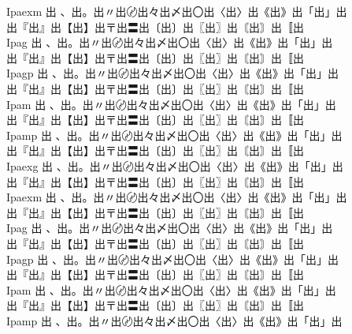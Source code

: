\begin{tabbing}
Ipaexm \> {\mktsFontfileIpaexm{}出 、出。出〃出〄出々出〆出〇出〈出〉出《出》出「出」出}\\
\> {\mktsFontfileIpaexm{}出『出』出【出】出〒出〓出〔出〕出〖出〗出〘出〙出〚出} \\
Ipag \> {\mktsFontfileIpag{}出 、出。出〃出〄出々出〆出〇出〈出〉出《出》出「出」出}\\
\> {\mktsFontfileIpag{}出『出』出【出】出〒出〓出〔出〕出〖出〗出〘出〙出〚出} \\
Ipagp \> {\mktsFontfileIpagp{}出 、出。出〃出〄出々出〆出〇出〈出〉出《出》出「出」出}\\
\> {\mktsFontfileIpagp{}出『出』出【出】出〒出〓出〔出〕出〖出〗出〘出〙出〚出} \\
Ipam \> {\mktsFontfileIpam{}出 、出。出〃出〄出々出〆出〇出〈出〉出《出》出「出」出}\\
\> {\mktsFontfileIpam{}出『出』出【出】出〒出〓出〔出〕出〖出〗出〘出〙出〚出} \\
Ipamp \> {\mktsFontfileIpamp{}出 、出。出〃出〄出々出〆出〇出〈出〉出《出》出「出」出}\\
\> {\mktsFontfileIpamp{}出『出』出【出】出〒出〓出〔出〕出〖出〗出〘出〙出〚出} \\
Ipaexg \> {\mktsFontfileIpaexg{}出 、出。出〃出〄出々出〆出〇出〈出〉出《出》出「出」出}\\
\> {\mktsFontfileIpaexg{}出『出』出【出】出〒出〓出〔出〕出〖出〗出〘出〙出〚出} \\
Ipaexm \> {\mktsFontfileIpaexm{}出 、出。出〃出〄出々出〆出〇出〈出〉出《出》出「出」出}\\
\> {\mktsFontfileIpaexm{}出『出』出【出】出〒出〓出〔出〕出〖出〗出〘出〙出〚出} \\
Ipag \> {\mktsFontfileIpag{}出 、出。出〃出〄出々出〆出〇出〈出〉出《出》出「出」出}\\
\> {\mktsFontfileIpag{}出『出』出【出】出〒出〓出〔出〕出〖出〗出〘出〙出〚出} \\
Ipagp \> {\mktsFontfileIpagp{}出 、出。出〃出〄出々出〆出〇出〈出〉出《出》出「出」出}\\
\> {\mktsFontfileIpagp{}出『出』出【出】出〒出〓出〔出〕出〖出〗出〘出〙出〚出} \\
Ipam \> {\mktsFontfileIpam{}出 、出。出〃出〄出々出〆出〇出〈出〉出《出》出「出」出}\\
\> {\mktsFontfileIpam{}出『出』出【出】出〒出〓出〔出〕出〖出〗出〘出〙出〚出} \\
Ipamp \> {\mktsFontfileIpamp{}出 、出。出〃出〄出々出〆出〇出〈出〉出《出》出「出」出}\\

\end{tabbing}
